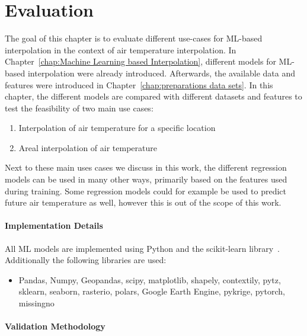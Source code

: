\chapter{Evaluation}
\label{chap:Evaluation}

The goal of this chapter is to evaluate different use-cases for ML-based interpolation in the context of air temperature interpolation. In Chapter~\ref{chap:Machine Learning based Interpolation}, different models for ML-based interpolation were already introduced. Afterwards, the available data and features were introduced in Chapter~\ref{chap:preparations data sets}. In this chapter, the different models are compared with different datasets and features to test the feasibility of two main use cases:

\begin{enumerate}
  \item Interpolation of air temperature for a specific location
  \item Areal interpolation of air temperature
\end{enumerate}

Next to these main uses cases we discuss in this work, the different regression models can be used in many other ways, primarily based on the features used during training. Some regression models could for example be used to predict future air temperature as well, however this is out of the scope of this work.

\subsubsection{Implementation Details}

All ML models are implemented using Python and the scikit-learn library~\cite{scikit-learn}. Additionally the following libraries are used:

\begin{itemize}
  \item Pandas, Numpy, Geopandas, scipy, matplotlib, shapely, contextily, pytz, sklearn, seaborn, rasterio, polars, Google Earth Engine, pykrige, pytorch, missingno
\end{itemize}

\subsubsection{Validation Methodology}
\label{sec:validation methodology}

